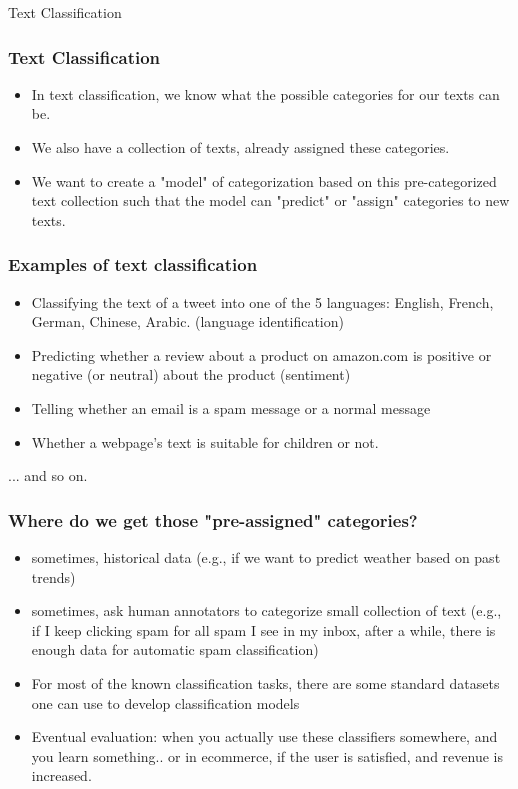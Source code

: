 \documentclass{beamer}
\begin{document}
\begin{frame}
\Large Text Classification
\end{frame}

\begin{frame}
\frametitle{Text Classification}
\begin{itemize}
\item In text classification, we know what the possible categories for our texts can be.
\item We also have a collection of texts, already assigned these categories. \pause
\item We want to create a "model" of categorization based on this pre-categorized text collection such that the model can "predict" or "assign" categories to new texts.
\end{itemize}
\end{frame}

\begin{frame}
\frametitle{Examples of text classification}
\begin{itemize}
\item Classifying the text of a tweet into one of the 5 languages: English, French, German, Chinese, Arabic. (language identification)
\item Predicting whether a review about a product on amazon.com is positive or negative (or neutral) about the product (sentiment)
\item Telling whether an email is a spam message or a normal message
\item Whether a webpage's text is suitable for children or not.
\end{itemize}
... and so on.
\end{frame}

\begin{frame}
\frametitle{Where do we get those "pre-assigned" categories?}
\begin{itemize}
\item sometimes, historical data (e.g., if we want to predict weather based on past trends) \pause
\item sometimes, ask human annotators to categorize small collection of text (e.g., if I keep clicking spam for all spam I see in my inbox, after a while, there is enough data for automatic spam classification) \pause
\item For most of the known classification tasks, there are some standard datasets one can use to develop classification models
\item Eventual evaluation: when you actually use these classifiers somewhere, and you learn something.. or in ecommerce, if the user is satisfied, and revenue is increased.
\end{itemize}
\end{frame}
\end{document}
